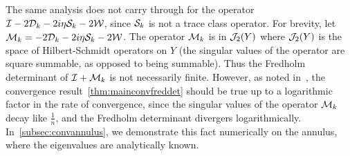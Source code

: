 \begin{remark}
The same analysis does not carry through for the operator
$\mathcal I - 2 {\mathcal D}_{k} - 2i\eta {\mathcal S}_{k} - 2{\mathcal W}$, 
since ${\mathcal S}_{k}$ is not a trace class operator.
For brevity, let ${\mathcal M}_{k} = -2{\mathcal D}_{k} - 2i\eta {\mathcal S}_{k} - 2{\mathcal W}$.
The operator ${\mathcal M}_{k}$ is 
in ${\mathcal J}_{2}(Y)$ where
${\mathcal J}_{2}(Y)$ is the space of Hilbert-Schmidt operators
on $Y$ (the singular values of the operator are square
summable, as opposed to being summable).
Thus the Fredholm determinant of $\mathcal I + {\mathcal M}_{k}$
is not necessarily finite. 
However, as noted in~\cite{zhao2015robust}, the convergence
result~\cref{thm:mainconvfreddet}
should be true up to a logarithmic factor in the rate
of convergence, since the singular values of the operator
${\mathcal M}_{k}$ decay like $\frac{1}{n}$, and the
Fredholm determinant divergers logarithmically. 
In~\cref{subsec:convannulus}, we demonstrate this fact
numerically on the annulus, where the eigenvalues are
analytically known. 
\end{remark}
